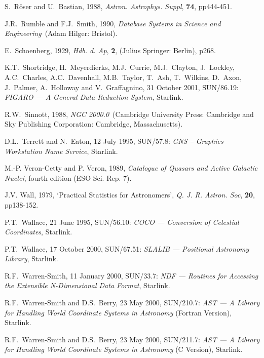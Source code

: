 \documentclass[twoside,11pt]{article}
\newcommand{\xref}[3]{#1}
\renewcommand{\_}{\texttt{\symbol{95}}}
\begin{document}
\begin{thebibliography}{99}
   S.~R\"{o}ser and U.~Bastian, 1988, {\it Astron.
   Astrophys. Suppl}, {\bf 74}, pp444-451.

   J.R.~Rumble and F.J.~Smith, 1990, {\it Database
   Systems in Science and Engineering}\, (Adam Hilger: Bristol).

   E.~Schoenberg, 1929, {\it Hdb. d. Ap}, {\bf 2},
   (Julius Springer: Berlin), p268.

   K.T.~Shortridge, H.~Meyerdierks, M.J.~Currie,
   M.J.~Clayton, J.~Lockley, A.C.~Charles, A.C.~Davenhall, M.B.~Taylor,
   T.~Ash, T.~Wilkins, D.~Axon, J.~Palmer, A.~Holloway and V.~Graffagnino,
   31 October 2001, \xref{SUN/86.19}{sun86}{}: {\it FIGARO --- A General
   Data Reduction System}, Starlink.

   R.W.~Sinnott, 1988, {\it NGC 2000.0}\, (Cambridge
   University Press: Cambridge and Sky Publishing Corporation: Cambridge,
   Massachusetts).

   D.L.~Terrett and N.~Eaton, 12 July 1995, 
   \xref{SUN/57.8}{sun57}{}: {\it GNS -- Graphics Workstation Name Service},
   Starlink.

   M.-P. Veron-Cetty and P. Veron, 1989, {\it Catalogue
   of Quasars and Active Galactic Nuclei}, fourth edition (ESO Sci. Rep. 7).

   J.V. Wall, 1979, `Practical Statistics for
   Astronomers', {\it Q. J. R. Astron. Soc}, {\bf 20},
   pp138-152.

   P.T.~Wallace, 21 June 1995, \xref{SUN/56.10}{sun56}{}:
   {\it COCO --- Conversion of Celestial Coordinates}, Starlink.

   P.T.~Wallace, 17 October 2000, \xref{SUN/67.51}{sun67}{}:
   {\it SLALIB --- Positional Astronomy Library}, Starlink.

   R.F.~Warren-Smith, 11 January 2000,
   \xref{SUN/33.7}{sun33}{}: {\it NDF --- Routines for Accessing the
   Extensible N-Dimensional Data Format}, Starlink.

   R.F.~Warren-Smith and D.S.~Berry, 23 May 2000,
   \xref{SUN/210.7}{sun210}{}: {\it AST --- A Library for Handling World
   Coordinate Systems in Astronomy}\/ (Fortran Version), Starlink.

   R.F.~Warren-Smith and D.S.~Berry, 23 May 2000,
   \xref{SUN/211.7}{sun211}{}: {\it AST --- A Library for Handling World
   Coordinate Systems in Astronomy}\/ (C Version), Starlink.

\end{thebibliography}


\typeout{  }
\typeout{*****************************************************}
\typeout{  }
\typeout{  }
\typeout{*****************************************************}
\typeout{  }
\end{document}
